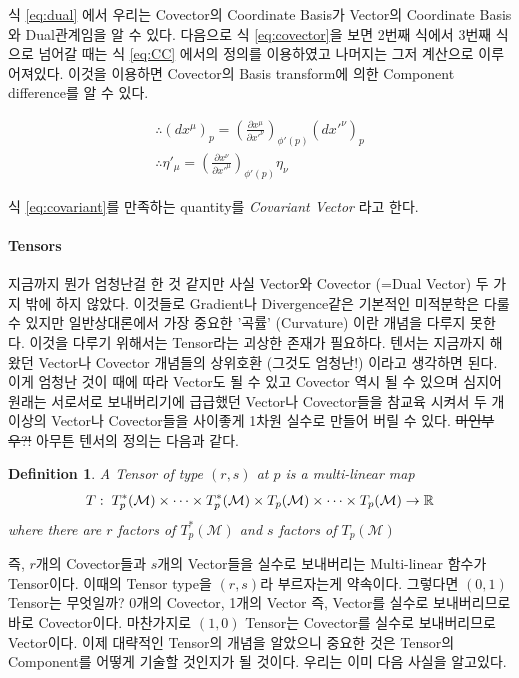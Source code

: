 \documentclass[final]{IEEEphot} %
\numberwithin{equation}{section} %
\numberwithin{figure}{section} %
\numberwithin{table}{section} %
\theoremstyle{plain}
\newtheorem{defn}{Definition} %
\newcommand{\Hs}{\hspace{0.1cm}}
\newcommand{\HS}{\hspace{0.5cm}}
\newcommand{\VS}{\vspace{0.3cm}}
\newcommand{\PD}[2]{\frac{\partial #1}{\partial #2}}
\newcommand{\BKS}[1]{\left( #1 \right)}
\newcommand{\Tangent}{T_p (\Manifold)}
\newcommand{\Cotangent}{T^{*}_p (\Manifold)}
\newcommand{\Manifold}{\mathcal{M}}
\begin{document}
\pagebreak

\HS 식 \ref{eq:dual} 에서 우리는 Covector의 Coordinate Basis가 Vector의 Coordinate Basis와 Dual관계임을 알 수 있다. 다음으로 식 \ref{eq:covector}을 보면 2번째 식에서 3번째 식으로 넘어갈 때는
식 \ref{eq:CC} 에서의 정의를 이용하였고 나머지는 그저 계산으로 이루어져있다. 이것을 이용하면 Covector의 Basis transform에 의한 Component difference를 알 수 있다.

\begin{gather}
 \therefore (dx^{\mu})_p = \BKS{\PD{x^{\mu}}{x'^{\nu}}}_{\phi'(p)} (dx'^{\nu})_p \\
 \therefore \eta'_{\mu} = \BKS{\PD{x^{\nu}}{x'^{\mu}}}_{\phi'(p)} \eta_{\nu} 
 \label{eq:covariant}
\end{gather}

식 \ref{eq:covariant}를 만족하는 quantity를 \emph{Covariant Vector} 라고 한다.

\paragraph{Tensors}

지금까지 뭔가 엄청난걸 한 것 같지만 사실 Vector와 Covector (=Dual Vector) 두 가지 밖에 하지 않았다. 이것들로 Gradient나 Divergence같은 기본적인 미적분학은 다룰 수 있지만
일반상대론에서 가장 중요한 '곡률' (Curvature) 이란 개념을 다루지 못한다. 이것을 다루기 위해서는 Tensor라는 괴상한 존재가 필요하다. 
텐서는 지금까지 해왔던 Vector나 Covector 개념들의 상위호환 (그것도 엄청난!) 이라고 생각하면 된다. 이게 엄청난 것이 때에 따라 Vector도 될 수 있고 Covector 역시 될 수 있으며 심지어
원래는 서로서로 보내버리기에 급급했던 Vector나 Covector들을 참교육 시켜서 두 개 이상의 Vector나 Covector들을 사이좋게 1차원 실수로 만들어 버릴 수 있다. \sout{마인부우?!} \Hs 아무튼 텐서의 정의는 다음과 같다.

\vspace{0.4cm}

\begin{defn}
 A Tensor of type $(r,s)$ at $p$ is a multi-linear map 
 \begin{equation*}
  T : \Hs \Cotangent \times \cdots \times \Cotangent \times \Tangent \times \cdots \times \Tangent \rightarrow \mathbb{R}
 \end{equation*}
 where there are $r$ factors of $\Cotangent$ and $s$ factors of $\Tangent$
\end{defn}

\VS

즉, $r$개의 Covector들과 $s$개의 Vector들을 실수로 보내버리는 Multi-linear 함수가 Tensor이다. 이때의 Tensor type을 $(r,s)$라 부르자는게 약속이다. 
그렇다면 $(0,1)$ Tensor는 무엇일까? 0개의 Covector, 1개의 Vector 즉, Vector를 실수로 보내버리므로 바로 Covector이다. 마찬가지로 $(1,0)$ Tensor는 Covector를 실수로 보내버리므로
Vector이다. 이제 대략적인 Tensor의 개념을 알았으니 중요한 것은 Tensor의 Component를 어떻게 기술할 것인지가 될 것이다. 우리는 이미 다음 사실을 알고있다.
\end{document}
